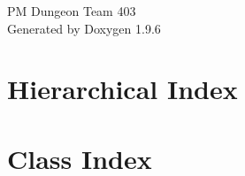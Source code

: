 \documentclass[twoside]{book}
\newcommand{\+}{\discretionary{\mbox{\scriptsize$\hookleftarrow$}}{}{}}
\newcommand{\clearemptydoublepage}{%
    \newpage{\pagestyle{empty}\cleardoublepage}%
  }
\begin{document}
  \raggedbottom
    \hypersetup{pageanchor=false,
                bookmarksnumbered=true,
                pdfencoding=unicode
               }
  \begin{titlepage}
  \vspace*{7cm}
  \begin{center}%
  {\Large PM Dungeon Team 403}\\
  \vspace*{1cm}
  {\large Generated by Doxygen 1.9.6}\\
  \end{center}
  \end{titlepage}
  \clearemptydoublepage
  \tableofcontents
  \clearemptydoublepage
  \hypersetup{pageanchor=true}
\chapter{Hierarchical Index}

\chapter{Class Index}

\end{document}
